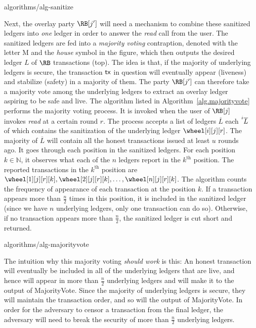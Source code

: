 {algorithms/alg-sanitize}

Next, the overlay party $\RB[j']$ will need a mechanism to combine these sanitized ledgers
into \emph{one} ledger in order to answer the \emph{read} call from the user.
The sanitized ledgers are fed into a \emph{majority voting} contraption, denoted with
the letter M and the \emph{house} symbol in the figure, which then outputs the desired
ledger $L$ of $\RB$ transactions (top).
The idea is that, if the majority of underlying ledgers is secure, the transaction $\textsf{tx}$
in question will eventually appear (liveness) and stabilize (safety) in a majority of them.
The party $\RB[j']$ can therefore take a majority vote among the underlying ledgers
to extract an overlay ledger aspiring to be safe and live.
The algorithm listed in Algorithm~\ref{alg.majorityvote} performs the majority voting
process. It is invoked when the user of $\RB[j]$ invokes \emph{read} at a certain
round $r$. The process accepts a list of ledgers $\overline{L}$ each $\prescript{i}{}{\overline{L}}$
of which contains the sanitization of the underlying ledger $\wheel[i][j][r]$.
The majority of $\overline{L}$ will contain all the honest
transactions issued at least $u$ rounds ago. It goes through each
position in the sanitized ledgers. For each position $k \in \mathbb{N}$,
it observes what each of the $n$ ledgers report in the $k^\text{th}$ position.
The reported transactions in the $k^\text{th}$ position are
$\wheel[1][j][r][k], \wheel[2][j][r][k], \ldots, \wheel[n][j][r][k]$.
The algorithm counts the frequency of appearance of each transaction at
the position $k$. If a transaction
appears more than $\frac{n}{2}$ times in this position, it is included in the sanitized ledger
(since we have $n$ underlying ledgers, only one transaction can do so).
Otherwise, if no transaction appears more than $\frac{n}{2}$, the sanitized ledger
is cut short and returned.

{algorithms/alg-majorityvote}

The intuition why this majority voting \emph{should work} is this: An honest
transaction will eventually be included in all of the underlying ledgers that
are live, and hence will appear in more than $\frac{n}{2}$ underlying ledgers
and will make it to the output of \textsf{MajorityVote}. Since the majority
of underlying ledgers is secure, they will maintain the transaction order,
and so will the output of \textsf{MajorityVote}. In order for the adversary
to censor a transaction from the final ledger, the adversary will need to
break the security of more than $\frac{n}{2}$ underlying ledgers.

